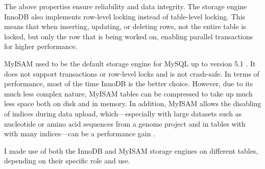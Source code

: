 The above properties ensure reliability and data integrity. The storage engine
InnoDB also implements row-level locking instead of table-level locking. This
means that when inserting, updating, or deleting rows, not the entire table is
locked, but only the row that is being worked on, enabling parallel transactions
for higher performance. 

MyISAM used to be the default storage engine for MySQL up to version 5.1
\citep{schwartz2012}. It does not support transactions or row-level locks and is
not crash-safe. In terms of performance, most of the time InnoDB is the better
choice. However, due to its much less complex nature, MyISAM tables can be
compressed to take up much less space both on disk and in memory. In addition,
MyISAM allows the disabling of indices during data upload, which---especially
with large datasets such as nucleotide or amino acid sequences from a genome
project and in tables with with many indices---can be a performance gain
\citep{mysql2013}. 

I made use of both the InnoDB and MyISAM storage engines on different
tables, depending on their specific role and use.
